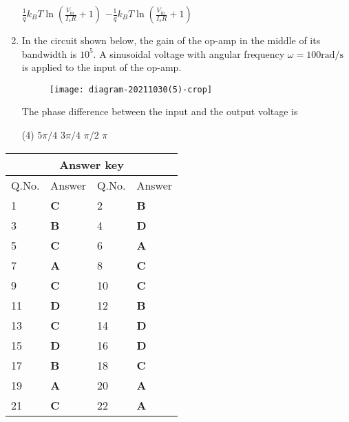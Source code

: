 \begin{enumerate}
\begin{tasks}
\task[\textbf{C.}]  $\frac{1}{q} k_{B} T \ln \left(\frac{V_{\text {in }}}{I_{s} R}+1\right)$
\task[\textbf{D.}]  $-\frac{1}{q} k_{B} T \ln \left(\frac{V_{\text {in }}}{I_{s} R}+1\right)$
\end{tasks}
	\item In the circuit shown below, the gain of the op-amp in the middle of its bandwidth is $10^{5}$. A sinusoidal voltage with angular frequency $\omega=100 \mathrm{rad} / \mathrm{s}$ is applied to the input of the op-amp.\\
	\begin{figure}[H]
		\centering
		\texttt{[image: diagram-20211030(5)-crop]}
		\caption{}
		\label{}
	\end{figure}
	The phase difference between the input and the output voltage is
{	}
\begin{tasks}(4)
\task[\textbf{A.}]  $5 \pi / 4$
\task[\textbf{B.}] $3 \pi / 4$
\task[\textbf{C.}] $\pi / 2$
\task[\textbf{D.}] $\pi$
\end{tasks}
\end{enumerate}
\setlength\arrayrulewidth{1pt}
\begin{table}[H]
	\centering
	\begin{tabular}{|p{1.5cm}|p{1.5cm}||p{1.5cm}|p{1.5cm}|}
		\hline
		\multicolumn{4}{|c|}{\textbf{Answer key}}\\\hline\hline
		\rowcolor{ocrel}Q.No.&Answer&Q.No.&Answer\\\hline
		1&\textbf{C} &2&\textbf{B}\\\hline 
		3&\textbf{B} &4&\textbf{D} \\\hline
		5&\textbf{C} &6&\textbf{A} \\\hline
		7&\textbf{A}&8&\textbf{C}\\\hline
		9&\textbf{C}&10&\textbf{C}\\\hline
		11&\textbf{D} &12&\textbf{B}\\\hline
		13&\textbf{C}&14&\textbf{D}\\\hline
		15&\textbf{D}&16&\textbf{D} \\\hline
		17&\textbf{B}&18&\textbf{C}\\\hline
		19&\textbf{A}&20&\textbf{A}\\\hline
		21&\textbf{C} &22&\textbf{A}\\\hline
		
	\end{tabular}
\end{table}

